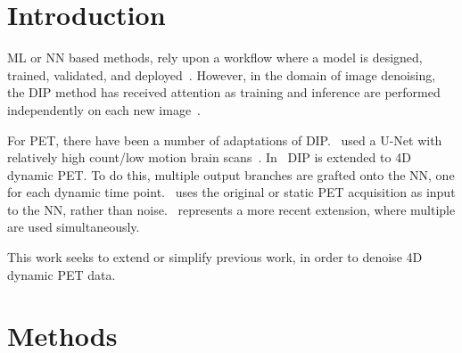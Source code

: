 \section{Introduction} \label{sec:introduction}
     \acrlong{ML} or \gls{NN} based methods, rely upon a workflow where a model is designed, trained, validated, and deployed~\cite{Krose2011AnNetworks}. %
    However, in the domain of image denoising, the \gls{DIP} method has received attention as training and inference are performed independently on each new image~\cite{Ulyanov2018DeepPrior}. %
    
    For \acrshort{PET}, there have been a number of adaptations of \gls{DIP}.~\cite{Gong2019PETPrior} used a U-Net with relatively high count/low motion brain scans~\cite{Weng2015U-Net:Segmentation}. In~\cite{Hashimoto20214DNetwork} \gls{DIP} is extended to \acrshort{4D} dynamic \acrshort{PET}. To do this, multiple output branches are grafted onto the \gls{NN}, one for each dynamic time point.~\cite{Hashimoto2019DynamicDatasets} uses the original or static \acrshort{PET} acquisition as input to the \gls{NN}, rather than noise.~\cite{Yang2022SimultaneousPrior} represents a more recent extension, where multiple  are used simultaneously.
    
    This work seeks to extend or simplify previous work, in order to denoise \acrshort{4D} dynamic \acrshort{PET} data.

    
\section{Methods}\label{sec:methods}
